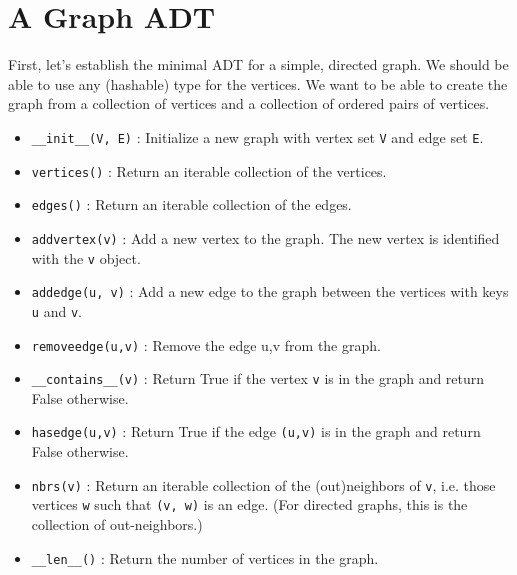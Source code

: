 \section{A Graph ADT}


First, let's establish the minimal ADT for a simple, directed graph.
We should be able to use any (hashable) type for the vertices.
We want to be able to create the graph from a collection of vertices and a collection of ordered pairs of vertices.

\begin{itemize}

\item \texttt{\_\_init\_\_(V, E)} : Initialize a new graph with vertex set \texttt{V} and edge set \texttt{E}.

\item \texttt{vertices()} : Return an iterable collection of the vertices.

\item \texttt{edges()} : Return an iterable collection of the edges.

\item \texttt{addvertex(v)} : Add a new vertex to the graph.  The new vertex is identified with the \texttt{v} object.

\item \texttt{addedge(u, v)} : Add a new edge to the graph between the vertices with keys \texttt{u} and \texttt{v}.

\item \texttt{removeedge(u,v)} : Remove the edge u,v from the graph.

\item \texttt{\_\_contains\_\_(v)} : Return True if the vertex \texttt{v} is in the graph and return False otherwise.

\item \texttt{hasedge(u,v)} : Return True if the edge \texttt{(u,v)} is in the graph and return False otherwise.

\item \texttt{nbrs(v)} : Return an iterable collection of the (out)neighbors of \texttt{v}, i.e. those vertices \texttt{w} such that \texttt{(v, w)} is an edge.  (For directed graphs, this is the collection of out-neighbors.)

\item \texttt{\_\_len\_\_()} : Return the number of vertices in the graph.

\end{itemize}


